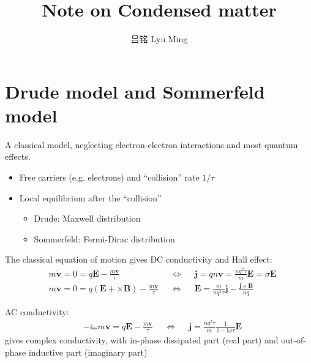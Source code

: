 \documentclass[11pt,letterpaper]{article}
\numberwithin{equation}{section} %
\renewcommand*{\vec}[1]{\bm{#1}}
\newcommand\mi{\mathrm{i}}
\begin{document}
\title{Note on Condensed matter}
\author{吕铭 Lyu Ming}
\maketitle
\begin{multicols}{2}
\tableofcontents
\end{multicols}
\section{Drude model and Sommerfeld model}
\label{sec:drude_model_and_sommerfeld_model}
A classical model, neglecting electron-electron interactions and most quantum
effects. 
\begin{itemize}
	\item Free carriers (e.g. electrons) and ``collision'' rate $1/\tau$
	\item Local equilibrium after the ``collision''
		\begin{itemize}
			\item Drude: Maxwell distribution
			\item Sommerfeld: Fermi-Dirac distribution
		\end{itemize}
\end{itemize}

The classical equation of motion gives DC conductivity and Hall effect: 
\begin{align}
	& m\dot{\vec v} = 0 = q\vec E - \frac{m\vec v}{\tau}
	&&\Leftrightarrow&&
	\vec j = qn\vec v = \frac{nq^2\tau}{m}\vec E = \sigma\vec E \\
	& m\vec v = 0 = q(\vec E + \vec \times \vec B) - \frac{m\vec v}{\tau}
	&&\Leftrightarrow&&
	\vec E = \frac{m}{nq^2\tau}\vec j - \frac{\vec j\times\vec B}{nq}
\end{align}

AC conductivity: 
\begin{align}
	&-\mi\omega m\vec v = q\vec E - \frac{m\vec v}{\tau}
	&&\Leftrightarrow&&
	\vec j = \frac{nq^2\tau}{m}\frac{1}{1-\mi\omega\tau}\vec E
\end{align}
gives complex conductivity, with in-phase dissipated part (real part) and
out-of-phase inductive part (imaginary part)
\end{document}
